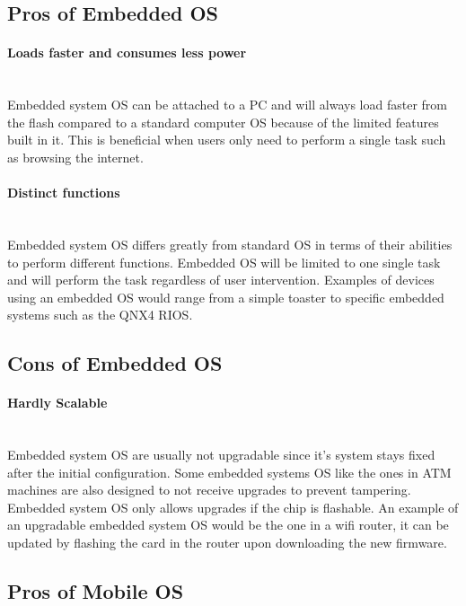 \documentclass[conference]{IEEEtran}
\newcommand{\forceindent}{\leavevmode{\parindent=1em\indent}}
\begin{document}
\medskip
\subsection{Pros of Embedded OS}
\paragraph{Loads faster and consumes less power} \mbox{} \\
\forceindent Embedded system OS can be attached to a PC and will always load faster from the flash compared to a standard computer OS because of the limited features built in it. This is beneficial when users only need to perform a single task such as browsing the internet\cite{TDDBM}.

\medskip
\paragraph{Distinct functions} \mbox{} \\
\forceindent Embedded system OS differs greatly from standard OS in terms of their abilities to perform different functions. Embedded OS will be limited to one single task and will perform the task regardless of user intervention. Examples of devices using an embedded OS would range from a simple toaster to specific embedded systems such as the QNX4 RIOS\cite{NOSvsEOS}.

\medskip
\subsection{Cons of Embedded OS}
\paragraph{Hardly Scalable} \mbox{} \\
\forceindent Embedded system OS are usually not upgradable since it's system stays fixed after the initial configuration. Some embedded systems OS like the ones in  ATM machines are also designed to not receive upgrades to prevent tampering. Embedded system OS only allows upgrades if the chip is flashable. An example of an upgradable embedded system OS would be the one in a wifi router, it can be updated by flashing the card in the router upon downloading the new firmware\cite{lifewire}.

\medskip
\subsection{Pros of Mobile OS}
\end{document}
